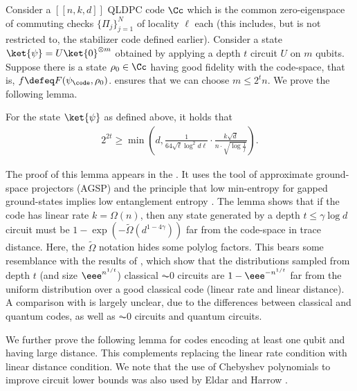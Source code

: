 \documentclass{toc}
\begin{document}
Consider a $[[n, k,d]]$ QLDPC code $\Cc$ which is the common zero-eigenspace of commuting checks $\{\Pi_j\}_{j=1}^N$ of locality $\ell$ each (this includes, but is not restricted to, the stabilizer code defined earlier). Consider a state $\ket{\psi}=U\ket{0}^{\otimes m}$ obtained by applying a depth $t$ circuit $U$ on $m$ qubits. Suppose there is a state $\rho_0\in \Cc$ having good fidelity with the code-space, that is, $f \defeq F(\psi_{\code},\rho_0)$.  ensures that we can choose $m\leq 2^tn$. We prove the following lemma.  
\begin{lemma}
\label{lem:rootdwarmup}
For the state $\ket{\psi}$ as defined above, it holds that
\begin{align}2^{2t}\geq \min\left(d, \frac{1}{64\sqrt{\ell}\log^2 d\ell}\cdot\frac{k\sqrt{d}}{ n  \cdot \sqrt{\log\frac{1}{f}}}\right).\end{align}
\end{lemma}
The proof of this lemma appears in the . It uses the tool of approximate ground-space projectors (AGSP) and the principle that low min-entropy for gapped ground-states implies low entanglement entropy \cite{hastings2007area_law, AradLV12, AradKLV13, AHS20}. The lemma shows that if the code has linear rate $k=\Omega(n)$, then any state generated by a depth $t \leq \gamma\log d$ circuit must be $1-\exp\left(-\widetilde{\Omega}\left(d^{1-4\gamma}\right)\right)$ far from the code-space in trace distance. Here, the $\tilde{\Omega}$ notation hides some polylog factors. This bears some resemblance with the results of \cite{BeckIL12, lovett-viola}, which show that the distributions sampled from depth $t$ (and size $\eee^{n^{1/t}}$) classical $\AC0$ circuits are $1-\eee^{-n^{1/t}}$ far from the uniform distribution over a good classical code (linear rate and linear distance). A comparison with  is largely unclear, due to the differences between classical and quantum codes, as well as $\AC0$ circuits and quantum circuits.  

We further prove the following lemma for codes encoding at least one qubit and having large distance. This complements  replacing the linear rate condition with linear distance condition. We note that the use of Chebyshev polynomials to improve circuit lower bounds was also used by Eldar and Harrow \cite[Propositions 44,45]{8104078}.
\end{document}

